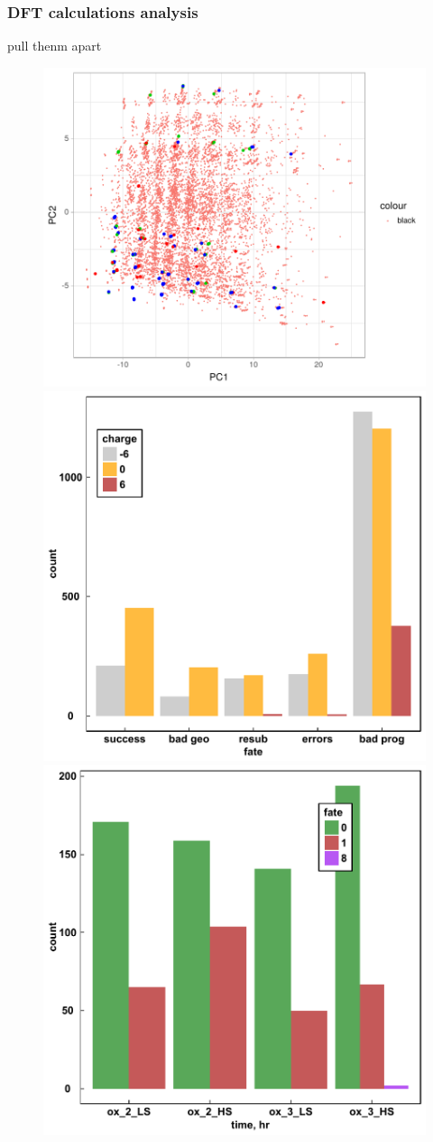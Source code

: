 \documentclass[xcolor=dvipsnames]{beamer}
\begin{document}
\begin{frame}
\frametitle{DFT calculations analysis}
pull thenm apart\\
\begin{figure}[ht] 
	\label{ fig7} 
	\begin{minipage}[b]{0.5\linewidth}
		\centering
		\includegraphics[width=.6\linewidth]{img/pcaWithCalcs.pdf} 
	\end{minipage}%
	\begin{minipage}[b]{0.5\linewidth}
		\centering
		\includegraphics[width=.6\linewidth]{img/fateByCharge.pdf} 
	\end{minipage} 
	\begin{minipage}[b]{0.5\linewidth}
		\centering
		\includegraphics[width=.6\linewidth]{img/fateBytype.pdf} 

\end{minipage}
\end{figure}
\end{frame}
\end{document}
